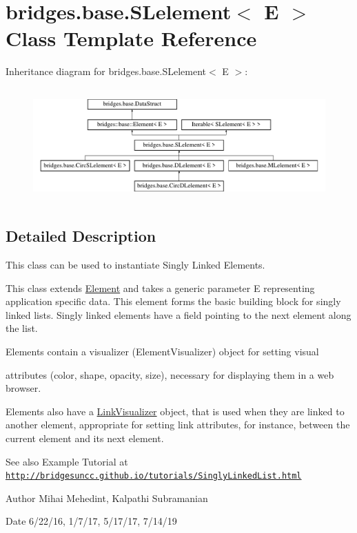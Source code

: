 \hypertarget{classbridges_1_1base_1_1_s_lelement}{}\section{bridges.\+base.\+S\+Lelement$<$ E $>$ Class Template Reference}
\label{classbridges_1_1base_1_1_s_lelement}
Inheritance diagram for bridges.\+base.\+S\+Lelement$<$ E $>$\+:\begin{figure}[H]
\begin{center}
\leavevmode
\includegraphics[height=4.402516cm]{classbridges_1_1base_1_1_s_lelement}
\end{center}
\end{figure}


\subsection{Detailed Description}
This class can be used to instantiate Singly Linked Elements. 

This class extends \hyperlink{classbridges_1_1base_1_1_element}{Element} and takes a generic parameter E representing application specific data. This element forms the basic building block for singly linked lists. Singly linked elements have a field pointing to the next element along the list.

\begin{DoxyVerb}Elements contain a visualizer (ElementVisualizer) object for setting visual
\end{DoxyVerb}
 attributes (color, shape, opacity, size), necessary for displaying them in a web browser.

Elements also have a \hyperlink{classbridges_1_1base_1_1_link_visualizer}{Link\+Visualizer} object, that is used when they are linked to another element, appropriate for setting link attributes, for instance, between the current element and its next element.

\begin{DoxySeeAlso}{See also}
Example Tutorial at \href{http://bridgesuncc.github.io/tutorials/SinglyLinkedList.html}{\tt http\+://bridgesuncc.\+github.\+io/tutorials/\+Singly\+Linked\+List.\+html}
\end{DoxySeeAlso}
\begin{DoxyAuthor}{Author}
Mihai Mehedint, Kalpathi Subramanian
\end{DoxyAuthor}
\begin{DoxyDate}{Date}
6/22/16, 1/7/17, 5/17/17, 7/14/19
\end{DoxyDate}

